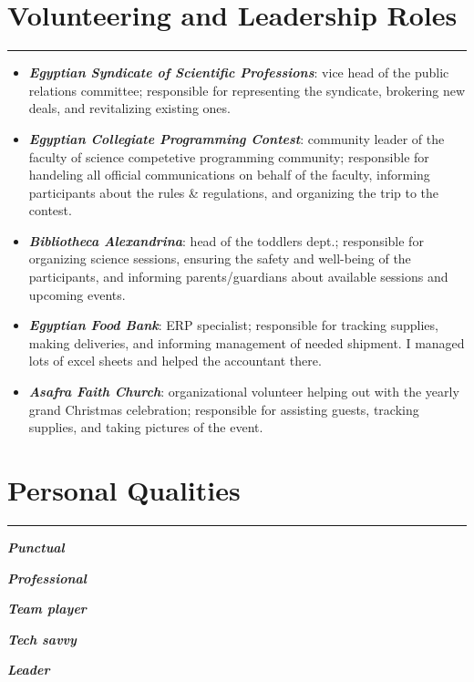 \documentclass[10pt]{article}
\newcommand{\fancy}[1]{\Large\textbf{\textit{#1}}}
\begin{document}
\vspace{1em}

\section*{Volunteering and Leadership Roles}
\hrule
\vspace{1em}
\begin{itemize}
	\item \fancy{Egyptian Syndicate of Scientific Professions}: vice head of the public relations committee; responsible for representing the syndicate, brokering new deals, and revitalizing existing ones.
	\item \fancy{Egyptian Collegiate Programming Contest}: community leader of the faculty of science competetive programming community; responsible for handeling all official communications on behalf of the faculty, informing participants about the rules \& regulations, and organizing the trip to the contest.
	\item \fancy{Bibliotheca Alexandrina}: head of the toddlers dept.; responsible for organizing science sessions, ensuring the safety and well-being of the participants, and informing parents/guardians about available sessions and upcoming events.
	\item \fancy{Egyptian Food Bank}: ERP specialist; responsible for tracking supplies, making deliveries, and informing management of needed shipment. I managed lots of excel sheets and helped the accountant there.
	\item \fancy{Asafra Faith Church}: organizational volunteer helping out with the yearly grand Christmas celebration; responsible for assisting guests, tracking supplies, and taking pictures of the event.
\end{itemize}

\section*{Personal Qualities}
\hrule
\vspace{1em}
\begin{itemize*}
\item \fancy{Punctual \quad\quad}
\item \fancy{Professional \quad\quad}
\item \fancy{Team player \quad\quad}
\item \fancy{Tech savvy \quad\quad}
\item \fancy{Leader}
\end{itemize*}
\end{document}
